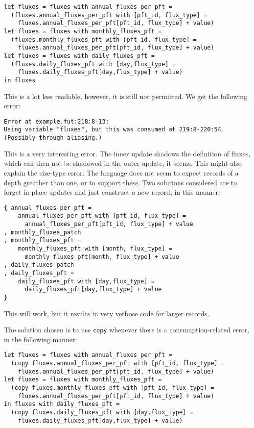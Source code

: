 \begin{verbatim}
let fluxes = fluxes with annual_fluxes_per_pft =
  (fluxes.annual_fluxes_per_pft with [pft_id, flux_type] =
    fluxes.annual_fluxes_per_pft[pft_id, flux_type] + value)
let fluxes = fluxes with monthly_fluxes_pft =
  (fluxes.monthly_fluxes_pft with [pft_id, flux_type] =
    fluxes.annual_fluxes_per_pft[pft_id, flux_type] + value)
let fluxes = fluxes with daily_fluxes_pft =
  (fluxes.daily_fluxes_pft with [day,flux_type] =
    fluxes.daily_fluxes_pft[day,flux_type] + value)
in fluxes
\end{verbatim}

This is a lot less readable, however, it is still not permitted. We get the following error:
\begin{verbatim}
Error at example.fut:218:8-13:
Using variable "fluxes", but this was consumed at 219:8-220:54.  (Possibly through aliasing.)
\end{verbatim}
This is a very interesting error. The inner update shadows the definition of fluxes, which can then not be shadowed in the outer update, it seems. This might also explain the size-type error. The language does not seem to expect records of a depth greather than one, or to support these. Two solutions considered are to forget in-place updates and just construct a new record, in this manner:

\begin{verbatim}
{ annual_fluxes_per_pft =
    annual_fluxes_per_pft with [pft_id, flux_type] =
      annual_fluxes_per_pft[pft_id, flux_type] + value
, monthly_fluxes_patch
, monthly_fluxes_pft =
    monthly_fluxes_pft with [month, flux_type] =
      monthly_fluxes_pft[month, flux_type] + value
, daily_fluxes_patch
, daily_fluxes_pft =
    daily_fluxes_pft with [day,flux_type] =
      daily_fluxes_pft[day,flux_type] + value
}
\end{verbatim}
This will work, but it results in very verbose code for larger records.

The solution chosen is to use \texttt{copy} whenever there is a consumption-related error, in the following manner:

\begin{verbatim}
let fluxes = fluxes with annual_fluxes_per_pft =
  (copy fluxes.annual_fluxes_per_pft with [pft_id, flux_type] =
    fluxes.annual_fluxes_per_pft[pft_id, flux_type] + value)
let fluxes = fluxes with monthly_fluxes_pft =
  (copy fluxes.monthly_fluxes_pft with [pft_id, flux_type] =
    fluxes.annual_fluxes_per_pft[pft_id, flux_type] + value)
in fluxes with daily_fluxes_pft =
  (copy fluxes.daily_fluxes_pft with [day,flux_type] =
    fluxes.daily_fluxes_pft[day,flux_type] + value)
\end{verbatim}

